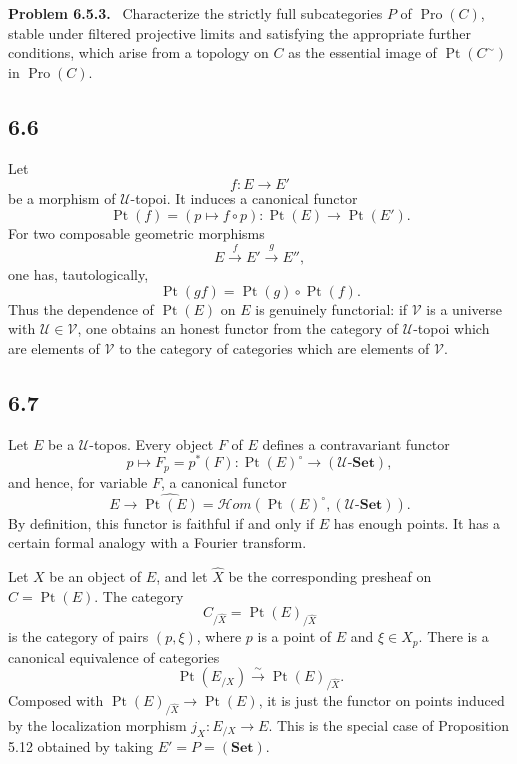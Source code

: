 \documentclass[11pt]{article}
\newcommand{\U}{\mathcal{U}}
\newcommand{\V}{\mathcal{V}}
\newcommand{\Set}{\mathbf{Set}}
\newcommand{\Ppoint}{\operatorname{Pt}}
\newcommand{\Hhom}{\mathcal{H}om}
\newenvironment{remarktext}[1]{\par\medskip\noindent\textbf{#1.}\ }{\par\medskip}
\begin{document}
\begin{remarktext}{Problem 6.5.3}
Characterize the strictly full subcategories \(P\) of \(\operatorname{Pro}(C)\), stable under filtered projective limits and satisfying the appropriate further conditions, which arise from a topology on \(C\) as the essential image of \(\Ppoint(C^{\sim})\) in \(\operatorname{Pro}(C)\).
\end{remarktext}

\subsection*{6.6}
Let
\[
f:E\longrightarrow E'
\]
be a morphism of \(\U\)-topoi. It induces a canonical functor
\[
\Ppoint(f)=(p\longmapsto f\circ p):\Ppoint(E)\longrightarrow\Ppoint(E').
\]
For two composable geometric morphisms
\[
E\xrightarrow{f}E'\xrightarrow{g}E'',
\]
one has, tautologically,
\[
\Ppoint(gf)=\Ppoint(g)\circ\Ppoint(f).
\]
Thus the dependence of \(\Ppoint(E)\) on \(E\) is genuinely functorial: if \(\V\) is a universe with \(\U\in\V\), one obtains an honest functor from the category of \(\U\)-topoi which are elements of \(\V\) to the category of categories which are elements of \(\V\).

\subsection*{6.7}
Let \(E\) be a \(\U\)-topos. Every object \(F\) of \(E\) defines a contravariant functor
\[
p\longmapsto F_p=p^*(F):\Ppoint(E)^\circ\longrightarrow(\U\text{-}\Set),
\]
and hence, for variable \(F\), a canonical functor
\begin{equation*}
E\longrightarrow \widehat{\Ppoint(E)}=\Hhom(\Ppoint(E)^\circ,(\U\text{-}\Set)).\tag{6.7.1}
\end{equation*}
By definition, this functor is faithful if and only if \(E\) has enough points. It has a certain formal analogy with a Fourier transform.

Let \(X\) be an object of \(E\), and let \(\widehat X\) be the corresponding presheaf on \(C=\Ppoint(E)\). The category
\[
C_{/\widehat X}=\Ppoint(E)_{/\widehat X}
\]
is the category of pairs \((p,\xi)\), where \(p\) is a point of \(E\) and \(\xi\in X_p\). There is a canonical equivalence of categories
\begin{equation*}
\Ppoint(E_{/X})\xrightarrow{\sim}\Ppoint(E)_{/\widehat X}.\tag{6.7.2}
\end{equation*}
Composed with \(\Ppoint(E)_{/\widehat X}\to\Ppoint(E)\), it is just the functor on points induced by the localization morphism \(j_X:E_{/X}\to E\). This is the special case of Proposition 5.12 obtained by taking \(E'=P=(\Set)\).
\end{document}
